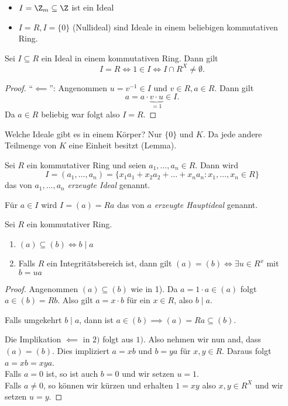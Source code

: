\begin{eg}
	\begin{itemize}
		\item $I = \Z_{m} \subseteq \Z$ ist ein Ideal
		\item $I = R, I = \{0\}$ (Nullideal) sind Ideale in einem beliebigen kommutativen Ring.
	\end{itemize}
\end{eg}

\begin{lemma}
	Sei $I \subseteq R$ ein Ideal in einem kommutativen Ring. Dann gilt 
	\[
	I = R \Leftrightarrow 1 \in I \Leftrightarrow I \cap R^{X} \neq \emptyset
	.\] 
\end{lemma}

\begin{proof}
	\enquote{$\impliedby$}: Angenommen $u = v^{-1} \in I$ und $v \in R, a \in R$. Dann gilt
	\[
	a = a \cdot \underbrace{v\cdot u}_{=1} \in I
	.\] 
	Da $a \in R$ beliebig war folgt also $I = R$.
\end{proof}

\begin{eg}
	Welche Ideale gibt es in einem Körper?
	Nur $\{0\}$ und $K$. Da jede andere Teilmenge von $K$ eine Einheit besitzt (Lemma).
\end{eg}

\begin{definition}
	Sei $R$ ein kommutativer Ring und seien $a_1,\ldots,a_{n} \in R$. Dann wird
	\[
		I = (a_1,\ldots,a_{n}) = \{x_1 a_1 + x_2 a_2 + \ldots + x_{n} a_{n} : x_1,\ldots,x_{n} \in R\} 
	\] 
	das von $a_1,\ldots,a_{n}$ \emph{erzeugte Ideal} genannt.

	Für $a \in I$ wird $I = (a) = Ra$ das von $a$ \emph{erzeugte Hauptideal} genannt.
\end{definition}

\begin{lemma}
	Sei $R$ ein kommutativer Ring.
	\begin{enumerate}[1)]
		\item $(a) \subseteq (b) \Leftrightarrow b \mid a$ 
		\item Falls $R $ ein Integritätsbereich ist, dann gilt $(a) = (b) \Leftrightarrow \exists u \in R^{x}$ mit $b = ua$
	\end{enumerate}
\end{lemma}

\begin{proof}
	Angenommen $(a) \subseteq (b)$ wie in 1). Da $a = 1\cdot a \in (a)$ folgt $a \in (b) = Rb$.
	Also gilt $a = x \cdot b$ für ein $x \in R$, also $b \mid a$.

	Falls umgekehrt $b \mid a$, dann ist $a \in (b) \implies (a) = R a \subseteq (b)$.

	Die Implikation $\impliedby$ in $2)$ folgt aus $1)$.
	Also nehmen wir nun and, dass $(a) = (b)$.
	Dies impliziert $a = xb$ und  $b = ya$ für $x,y \in R$.
	Daraus folgt $a = x b = xy a$.\\
	Falls  $a = 0$ ist, so ist auch $b = 0$ und wir setzen $u = 1$.\\
	Falls $a \neq 0$, so können wir kürzen und erhalten $1 = xy$ also $x,y \in R^{X}$ und wir setzen $u = y$.
\end{proof}

